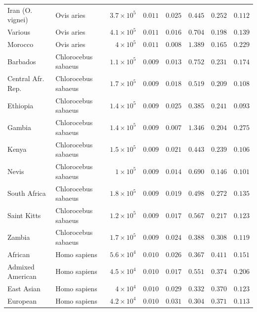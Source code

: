 \documentclass{article}
\begin{document}
\begin{center}
\begin{longtable*}{|l|l|r|r|r|r|r|r|}
            Iran (O. vignei) & Ovis aries & $3.7\times 10^{5}$ & $ 0.011$ & $ 0.025$ & $ 0.445$ & $ 0.252$ & $ 0.112$ \\
            Various & Ovis aries & $4.1\times 10^{5}$ & $ 0.011$ & $ 0.016$ & $ 0.704$ & $ 0.198$ & $ 0.139$ \\
            Morocco & Ovis aries & $ 4\times 10^{5}$ & $ 0.011$ & $ 0.008$ & $ 1.389$ & $ 0.165$ & $ 0.229$ \\
             Barbados & Chlorocebus sabaeus & $1.1\times 10^{5}$ & $ 0.009$ & $ 0.013$ & $ 0.752$ & $ 0.231$ & $ 0.174$ \\
             Central Afr. Rep. & Chlorocebus sabaeus & $1.7\times 10^{5}$ & $ 0.009$ & $ 0.018$ & $ 0.519$ & $ 0.209$ & $ 0.108$ \\
             Ethiopia & Chlorocebus sabaeus & $1.4\times 10^{5}$ & $ 0.009$ & $ 0.025$ & $ 0.385$ & $ 0.241$ & $ 0.093$ \\
             Gambia & Chlorocebus sabaeus & $1.4\times 10^{5}$ & $ 0.009$ & $ 0.007$ & $ 1.346$ & $ 0.204$ & $ 0.275$ \\
             Kenya & Chlorocebus sabaeus & $1.5\times 10^{5}$ & $ 0.009$ & $ 0.021$ & $ 0.443$ & $ 0.239$ & $ 0.106$ \\
             Nevis & Chlorocebus sabaeus & $ 1\times 10^{5}$ & $ 0.009$ & $ 0.014$ & $ 0.690$ & $ 0.146$ & $ 0.101$ \\
             South Africa & Chlorocebus sabaeus & $1.8\times 10^{5}$ & $ 0.009$ & $ 0.019$ & $ 0.498$ & $ 0.272$ & $ 0.135$ \\
             Saint Kitts & Chlorocebus sabaeus & $1.2\times 10^{5}$ & $ 0.009$ & $ 0.017$ & $ 0.567$ & $ 0.217$ & $ 0.123$ \\
             Zambia & Chlorocebus sabaeus & $1.7\times 10^{5}$ & $ 0.009$ & $ 0.024$ & $ 0.388$ & $ 0.308$ & $ 0.119$ \\
            African & Homo sapiens & $5.6\times 10^{4}$ & $ 0.010$ & $ 0.026$ & $ 0.367$ & $ 0.411$ & $ 0.151$ \\
            Admixed American & Homo sapiens & $4.5\times 10^{4}$ & $ 0.010$ & $ 0.017$ & $ 0.551$ & $ 0.374$ & $ 0.206$ \\
            East Asian & Homo sapiens & $ 4\times 10^{4}$ & $ 0.010$ & $ 0.029$ & $ 0.332$ & $ 0.370$ & $ 0.123$ \\
            European & Homo sapiens & $4.2\times 10^{4}$ & $ 0.010$ & $ 0.031$ & $ 0.304$ & $ 0.371$ & $ 0.113$ \\

\end{longtable*}
\end{center}
\end{document}
